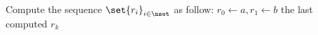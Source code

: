 \documentclass{subfiles}
\begin{document}
    \begin{algorithm}
        \caption{Euclidean algorithm}\label{algo:simple-euclidean}
        Compute the sequence $\set{r_{i}}_{i \in \nset}$ as follow:
            $r_{0} \leftarrow a, r_{1} \leftarrow b$ \DontPrintSemicolon\;
        \Indp{}
        \Indm\Return the last computed $r_{k}$
    \end{algorithm}
\end{document}
